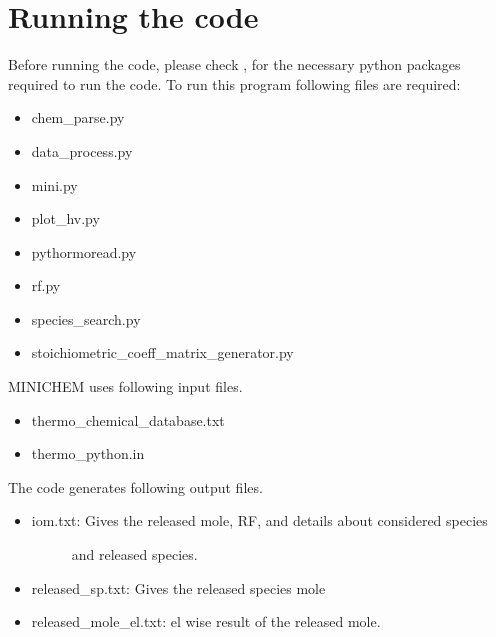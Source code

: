 \documentclass[letterpaper,10pt,english]{sphinxmanual}
\begin{document}
\chapter{Running the code}
\label{\detokenize{running:running-the-code}}\label{\detokenize{running::doc}}
Before running the code, please check {\hyperref[\detokenize{Requirements:requirements}]{}}, for the necessary python packages required to run the code. To run this program following files are required:
\begin{itemize}
\item {} 
chem\_parse.py

\item {} 
data\_process.py

\item {} 
mini.py

\item {} 
plot\_hv.py

\item {} 
pythormoread.py

\item {} 
rf.py

\item {} 
species\_search.py

\item {} 
stoichiometric\_coeff\_matrix\_generator.py

\end{itemize}

MINICHEM uses following input files.

\begin{itemize}
\item {} 
thermo\_chemical\_database.txt

\item {} 
thermo\_python.in

\end{itemize}

The code generates following output files.

\begin{itemize}
\item {} \begin{description}
\item[{iom.txt: Gives the released mole, RF, and details about considered species}] \leavevmode
and released species.

\end{description}

\item {} 
released\_sp.txt: Gives the released species mole

\item {} 
released\_mole\_el.txt: el wise result of the released mole.

\end{itemize}
\end{document}
